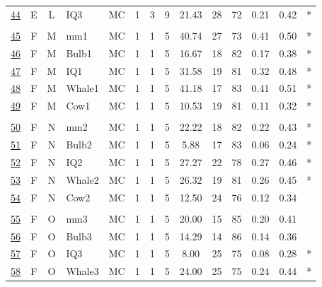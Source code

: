\documentclass[12pt,nohyper]{tufte-handout}\usepackage[]{graphicx}\usepackage[]{color}
\begin{document}
\begin{longtable}{cccl|cccc|ccccc|l}
  \hyperlink{T06.E.L.09.3.1.MC.IQ3.2}{44} & E & L & IQ3 & MC &   1 &   3 &   9 & 21.43 &  28 &  72 & 0.21 & 0.42 & * \\ 
   &  &  &  &  &  &  &  &  &  &  &  &  &  \\ 
  \hyperlink{T06.F.M.05.1.1.MC.mm1.2}{45} & F & M & mm1 & MC &   1 &   1 &   5 & 40.74 &  27 &  73 & 0.41 & 0.50 & * \\ 
  \hyperlink{T06.F.M.05.1.1.MC.Bulb1.2}{46} & F & M & Bulb1 & MC &   1 &   1 &   5 & 16.67 &  18 &  82 & 0.17 & 0.38 & * \\ 
  \hyperlink{T06.F.M.05.1.1.MC.IQ1.2}{47} & F & M & IQ1 & MC &   1 &   1 &   5 & 31.58 &  19 &  81 & 0.32 & 0.48 & * \\ 
  \hyperlink{T06.F.M.05.1.1.MC.Whale1.2}{48} & F & M & Whale1 & MC &   1 &   1 &   5 & 41.18 &  17 &  83 & 0.41 & 0.51 & * \\ 
  \hyperlink{T06.F.M.05.1.1.MC.Cow1.2}{49} & F & M & Cow1 & MC &   1 &   1 &   5 & 10.53 &  19 &  81 & 0.11 & 0.32 & * \\ 
   &  &  &  &  &  &  &  &  &  &  &  &  &  \\ 
  \hyperlink{T06.F.N.05.1.1.MC.mm2.2}{50} & F & N & mm2 & MC &   1 &   1 &   5 & 22.22 &  18 &  82 & 0.22 & 0.43 & * \\ 
  \hyperlink{T06.F.N.05.1.1.MC.Bulb2.2}{51} & F & N & Bulb2 & MC &   1 &   1 &   5 & 5.88 &  17 &  83 & 0.06 & 0.24 & * \\ 
  \hyperlink{T06.F.N.05.1.1.MC.IQ2.2}{52} & F & N & IQ2 & MC &   1 &   1 &   5 & 27.27 &  22 &  78 & 0.27 & 0.46 & * \\ 
  \hyperlink{T06.F.N.05.1.1.MC.Whale2.2}{53} & F & N & Whale2 & MC &   1 &   1 &   5 & 26.32 &  19 &  81 & 0.26 & 0.45 & * \\ 
  \hyperlink{T06.F.N.05.1.1.MC.Cow2.2}{54} & F & N & Cow2 & MC &   1 &   1 &   5 & 12.50 &  24 &  76 & 0.12 & 0.34 &  \\ 
   &  &  &  &  &  &  &  &  &  &  &  &  &  \\ 
  \hyperlink{T06.F.O.05.1.1.MC.mm3.2}{55} & F & O & mm3 & MC &   1 &   1 &   5 & 20.00 &  15 &  85 & 0.20 & 0.41 &  \\ 
  \hyperlink{T06.F.O.05.1.1.MC.Bulb3.2}{56} & F & O & Bulb3 & MC &   1 &   1 &   5 & 14.29 &  14 &  86 & 0.14 & 0.36 &  \\ 
  \hyperlink{T06.F.O.05.1.1.MC.IQ3.2}{57} & F & O & IQ3 & MC &   1 &   1 &   5 & 8.00 &  25 &  75 & 0.08 & 0.28 & * \\ 
  \hyperlink{T06.F.O.05.1.1.MC.Whale3.2}{58} & F & O & Whale3 & MC &   1 &   1 &   5 & 24.00 &  25 &  75 & 0.24 & 0.44 & * \\ 

\end{longtable}
\end{document}
